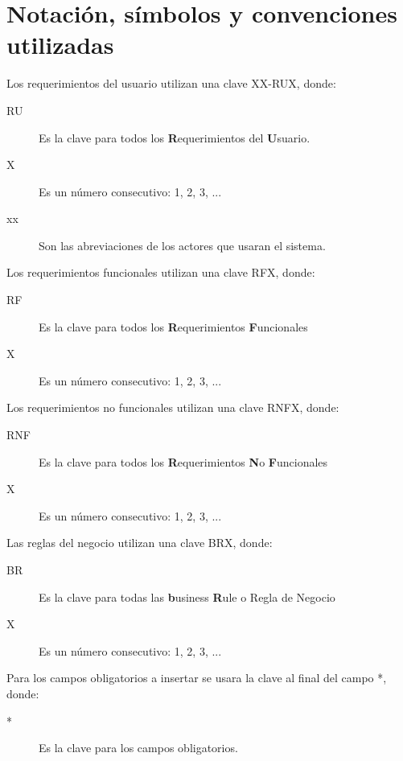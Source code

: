 \section{Notación, símbolos y convenciones utilizadas}
\setlength{\parindent}{0cm}
Los requerimientos del usuario utilizan una clave XX-RUX, donde:
    
\begin{description}
    \item[RU] Es la clave para todos los {\bf R}equerimientos del {\bf U}suario.
    \item[X] Es un número consecutivo: 1, 2, 3, ...
    \item[xx]  Son las abreviaciones de los actores que usaran el sistema.
\end{description}

 Los requerimientos funcionales utilizan una clave RFX, donde:
    
\begin{description}
    \item[RF] Es la clave para todos los {\bf R}equerimientos {\bf F}uncionales
    \item[X] Es un número consecutivo: 1, 2, 3, ...
\end{description}

 Los requerimientos no funcionales utilizan una clave RNFX, donde:
    
\begin{description}
    \item[RNF] Es la clave para todos los {\bf R}equerimientos {\bf N}o {\bf F}uncionales
    \item[X] Es un número consecutivo: 1, 2, 3, ...
\end{description}

Las reglas del negocio utilizan una clave BRX, donde:
    
\begin{description}
    \item[BR] Es la clave para todas las {\bf b}usiness {\bf R}ule o Regla de Negocio
    \item[X] Es un número consecutivo: 1, 2, 3, ...
\end{description}

Para los campos obligatorios a insertar se usara la clave al final del campo *, donde:
    
\begin{description}
    \item[*] Es la clave para los campos obligatorios.
\end{description}

